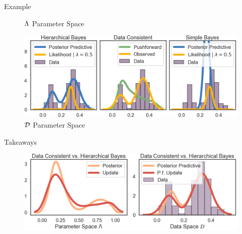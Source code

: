 \begin{block}{Example}
\begin{figure}
        \vspace{-0.5cm}
        \centering
        \caption{\large $\Lambda$ Parameter Space }
\end{figure}
\vspace{-0.5cm}
\begin{figure}
        \includegraphics[width=32cm]{figures/distr_EX_data_space.png}
        \vspace{-0.5cm}
        \centering
        \caption{\large $\mathcal{D}$ Parameter Space  }
\end{figure}


\end{block}


\vspace{-1.cm}


\begin{block}{Takeaways}

\centering
\vspace{-0.5cm}
\begin{figure}
        \includegraphics[width=30cm]{figures/distr_EX_comparison.png}
        \vspace{-0.5cm} 
        \caption{ }
    \end{figure}
\end{block}

